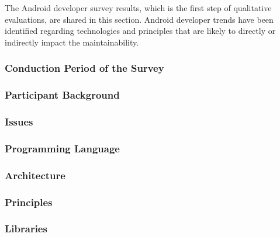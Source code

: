 The Android developer survey results, which is the first step of qualitative evaluations, are shared in this section. Android developer trends have been identified regarding technologies and principles that are likely to directly or indirectly impact the maintainability.

\subsubsection{Conduction Period of the Survey}


\subsubsection{Participant Background}


\subsubsection{Issues}


\subsubsection{Programming Language}


\subsubsection{Architecture}


\subsubsection{Principles}


\subsubsection{Libraries}
